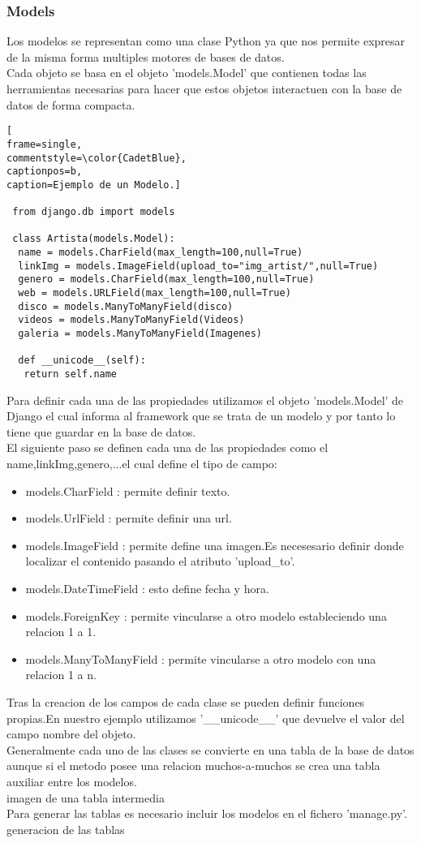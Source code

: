 \subsubsection{Models}
Los modelos se representan como una clase Python ya que nos permite expresar de la misma forma multiples motores de bases de datos.
\\Cada objeto se basa en el objeto 'models.Model' que contienen todas las herramientas necesarias para hacer que estos objetos interactuen con la base de datos de forma compacta.
\begin{lstlisting}[
frame=single,
commentstyle=\color{CadetBlue},
captionpos=b,
caption=Ejemplo de un Modelo.]

 from django.db import models
 
 class Artista(models.Model):
  name = models.CharField(max_length=100,null=True)
  linkImg = models.ImageField(upload_to="img_artist/",null=True)
  genero = models.CharField(max_length=100,null=True)
  web = models.URLField(max_length=100,null=True)
  disco = models.ManyToManyField(disco)
  videos = models.ManyToManyField(Videos) 
  galeria = models.ManyToManyField(Imagenes)
  
  def __unicode__(self):
   return self.name
\end{lstlisting}
Para definir cada una de las propiedades utilizamos el objeto 'models.Model' de Django el cual informa al framework que se trata de un modelo y por tanto lo tiene que guardar en la base de datos.
\\El siguiente paso se definen cada una de las propiedades como el name,linkImg,genero,...el cual define el tipo de campo:
\begin{itemize}
\item models.CharField : permite definir texto.
\item models.UrlField : permite definir una url.
\item models.ImageField : permite define una imagen.Es necesesario definir donde localizar el contenido pasando el atributo 'upload\_to'.
\item models.DateTimeField : esto define fecha y hora.
\item models.ForeignKey : permite vincularse a otro modelo estableciendo una relacion 1 a 1.
\item models.ManyToManyField : permite vincularse a otro modelo con una relacion 1 a n.
\end{itemize}
Tras la creacion de los campos de cada clase se pueden definir funciones propias.En nuestro ejemplo utilizamos '\_\_unicode\_\_'  que devuelve el valor del campo nombre del objeto.
\\Generalmente cada uno de  las clases se convierte en una tabla de la base de datos aunque si el metodo posee una relacion muchos-a-muchos se crea una tabla auxiliar entre los modelos.
\\imagen de una tabla intermedia
\\Para generar las tablas es necesario incluir los modelos en el fichero 'manage.py'.
\\generacion de las tablas 
